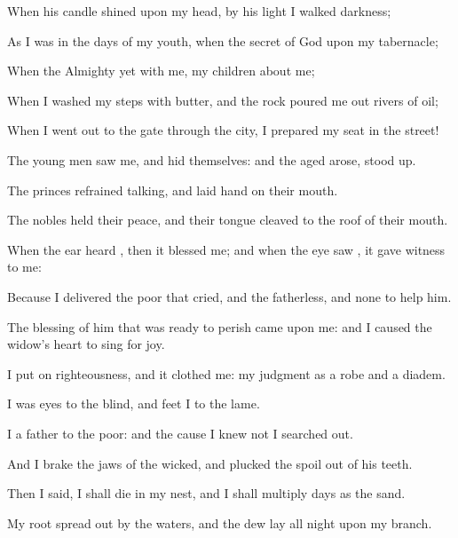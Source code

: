 {When his
candle
shined upon my
head,
{} by his
light I
walked
{}
darkness;

As I was in the
days of my
youth, when the
secret of
God
{} upon my
tabernacle;

When the
Almighty
{} yet with me,
{} my
children
{}
about me;

When I
washed my
steps with
butter, and the
rock poured me
out
rivers of
oil;


\par }{\PP {}When I went
out to the
gate through the
city,
{} I
prepared my
seat in the
street!

The young
men
saw me, and
hid themselves: and the
aged
arose,
{} stood
up.

The
princes
refrained
talking, and
laid
{}
hand on their
mouth.

The
nobles
held their
peace, and their
tongue
cleaved to the roof of their
mouth.

When the
ear
heard
{}, then it
blessed me; and when the
eye
saw
{}, it gave
witness to me:

Because I
delivered the
poor that
cried, and the
fatherless, and
{} none to
help him.

The
blessing of him that was ready to
perish
came upon me: and I caused the
widow’s
heart to sing for
joy.

I
put on
righteousness, and it
clothed me: my
judgment
{} as a
robe and a
diadem.

I was
eyes to the
blind, and
feet
{} I to the
lame.

I
{} a
father to the
poor: and the
cause
{} I
knew not I searched
out.

And I
brake the
jaws of the
wicked, and
plucked the
spoil out of his
teeth.


\par }{\PP {}Then I
said, I shall
die in my
nest, and I shall
multiply
{}
days as the
sand.

My
root
{} spread
out by the
waters, and the
dew lay all
night upon my
branch.

}
